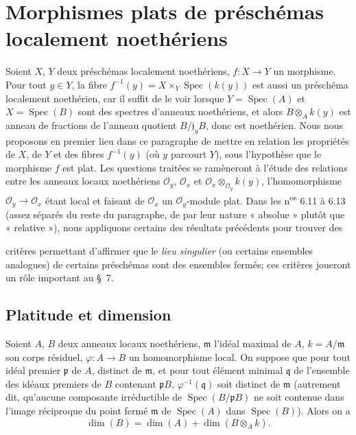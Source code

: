 \section{Morphismes plats de préschémas localement noethériens}

Soient $X$, $Y$ deux préschémas localement noethériens, $f:X\to Y$ un
morphisme. Pour tout $y\in Y$, la fibre
$f^{-1}(y)=X\times_Y\operatorname{Spec}(k(y))$ est aussi un préschéma
localement noethérien, car il suffit de le voir lorsque
$Y=\operatorname{Spec}(A)$ et $X=\operatorname{Spec}(B)$ sont des spectres
d'anneaux noethériens, et alors $B\otimes_A k(y)$ est anneau de fractions de
l'anneau quotient $B/\mathfrak j_yB$, donc est noethérien. Nous nous proposons
en premier lieu dans ce paragraphe de mettre en relation les propriétés de
$X$, de $Y$ et des fibres $f^{-1}(y)$ (où $y$ parcourt $Y$), sous l'hypothèse
que le morphisme $f$ est plat. Les questions traitées se ramèneront à l'étude
des relations entre les anneaux locaux noethériens
$\mathcal O_y$, $\mathcal O_x$ et
$\mathcal O_x\otimes_{\mathcal O_y}k(y)$, l'homomorphisme
$\mathcal O_y\to\mathcal O_x$ étant local et faisant de $\mathcal O_x$ un
$\mathcal O_y$-module plat. Dans les n\textsuperscript{os} 6.11 à 6.13 (assez
séparés du reste du paragraphe, de par leur nature « absolue » plutôt que
« relative »), nous appliquons certains des résultats précédents pour trouver
des


critères permettant d'affirmer que le \emph{lieu singulier} (ou certains
ensembles analogues) de certains préschémas sont des ensembles fermés; ces
critères joueront un rôle important au §~7.

\subsection{Platitude et dimension}

\begin{proposition}[6.1.1]
\label{IV.2.s6.1.1-fr}
Soient $A$, $B$ deux anneaux locaux noethériens, $\mathfrak m$ l'idéal maximal
de $A$, $k=A/\mathfrak m$ son corps résiduel,
$\varphi:A\to B$ un homomorphisme local. On suppose que pour tout idéal
premier $\mathfrak p$ de $A$, distinct de $\mathfrak m$, et pour tout élément
minimal $\mathfrak q$ de l'ensemble des idéaux premiers de $B$ contenant
$\mathfrak pB$, $\varphi^{-1}(\mathfrak q)$ soit distinct de $\mathfrak m$
(autrement dit, qu'aucune composante irréductible de
$\operatorname{Spec}(B/\mathfrak pB)$ ne soit contenue dans l'image réciproque
du point fermé $\mathfrak m$ de $\operatorname{Spec}(A)$ dans
$\operatorname{Spec}(B)$). Alors on a
\begin{equation}
\dim(B)=\dim(A)+\dim(B\otimes_A k).
\tag{6.1.1.1}\label{IV.2.s6.1.1.1-fr}
\end{equation}
\end{proposition}

